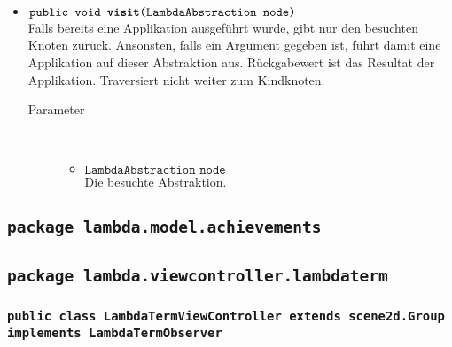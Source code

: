 \begin{description}
\begin{itemize}
		\item $\texttt{public void \textbf{visit}(LambdaAbstraction node)}$ \\ Falls bereits eine Applikation ausgeführt wurde, gibt nur den besuchten Knoten zurück. Ansonsten, falls ein Argument gegeben ist, führt damit eine Applikation auf dieser Abstraktion aus. Rückgabewert ist das Resultat der Applikation. Traversiert nicht weiter zum Kindknoten.
		\begin{description}
			\item[Parameter] \hfill \\
			\vspace{-.8cm}
			\begin{itemize}
				\item $\texttt{LambdaAbstraction node}$ \\ Die besuchte Abstraktion.
			\end{itemize}
		\end{description}
	\end{itemize}
\end{description}





\subsection{\texttt{package lambda.model.achievements}}


\subsection{\texttt{package lambda.viewcontroller.lambdaterm}}

\subsubsection{\normalfont \texttt{public class \textbf{LambdaTermViewController} extends scene2d.Group implements LambdaTermObserver}}

